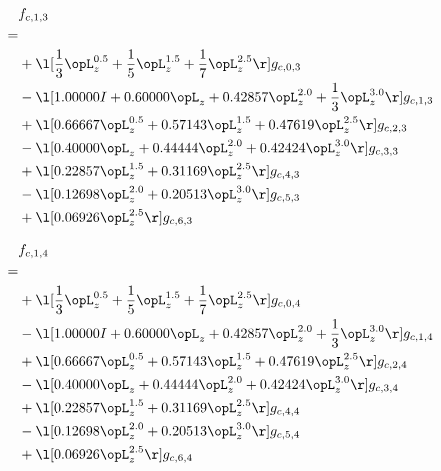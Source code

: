 \begin{alignat}{2} 
\label{eq:f_13_0} 
& f_{c,1,3} \nonumber \\ 
 = \\ 
& + \l[ \frac{1}{3} \opL_z^{0.5} + \frac{1}{5} \opL_z^{1.5} + \frac{1}{7} \opL_z^{2.5}  \r] g_{c,0,3} \nonumber \\ 
& - \l[  1.00000 I +  0.60000 \opL_z +  0.42857 \opL_z^{2.0} + \frac{1}{3} \opL_z^{3.0}  \r] g_{c,1,3} \nonumber \\ 
& + \l[  0.66667 \opL_z^{0.5} +  0.57143 \opL_z^{1.5} +  0.47619 \opL_z^{2.5}  \r] g_{c,2,3} \nonumber \\ 
& - \l[  0.40000 \opL_z +  0.44444 \opL_z^{2.0} +  0.42424 \opL_z^{3.0}  \r] g_{c,3,3} \nonumber \\ 
& + \l[  0.22857 \opL_z^{1.5} +  0.31169 \opL_z^{2.5}  \r] g_{c,4,3} \nonumber \\ 
& - \l[  0.12698 \opL_z^{2.0} +  0.20513 \opL_z^{3.0}  \r] g_{c,5,3} \nonumber \\ 
& + \l[  0.06926 \opL_z^{2.5}  \r] g_{c,6,3} \nonumber \\ 
\end{alignat} 


\begin{alignat}{2} 
\label{eq:f_14_0} 
& f_{c,1,4} \nonumber \\ 
 = \\ 
& + \l[ \frac{1}{3} \opL_z^{0.5} + \frac{1}{5} \opL_z^{1.5} + \frac{1}{7} \opL_z^{2.5}  \r] g_{c,0,4} \nonumber \\ 
& - \l[  1.00000 I +  0.60000 \opL_z +  0.42857 \opL_z^{2.0} + \frac{1}{3} \opL_z^{3.0}  \r] g_{c,1,4} \nonumber \\ 
& + \l[  0.66667 \opL_z^{0.5} +  0.57143 \opL_z^{1.5} +  0.47619 \opL_z^{2.5}  \r] g_{c,2,4} \nonumber \\ 
& - \l[  0.40000 \opL_z +  0.44444 \opL_z^{2.0} +  0.42424 \opL_z^{3.0}  \r] g_{c,3,4} \nonumber \\ 
& + \l[  0.22857 \opL_z^{1.5} +  0.31169 \opL_z^{2.5}  \r] g_{c,4,4} \nonumber \\ 
& - \l[  0.12698 \opL_z^{2.0} +  0.20513 \opL_z^{3.0}  \r] g_{c,5,4} \nonumber \\ 
& + \l[  0.06926 \opL_z^{2.5}  \r] g_{c,6,4} \nonumber \\ 
\end{alignat} 


